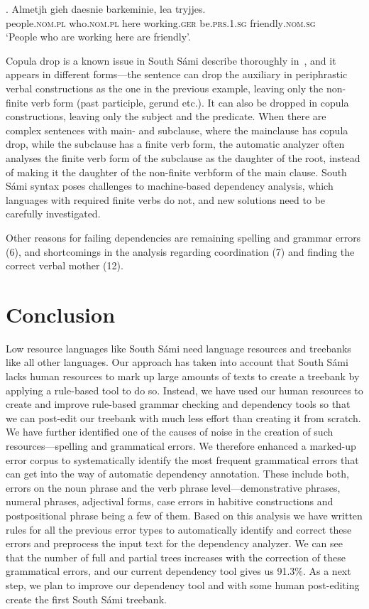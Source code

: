 \documentclass[free]{flammie}
\begin{document}
\exg. Almetjh gieh daesnie barkeminie, lea tryjjes.\label{almetjh}\\
people\textsc{.nom.pl} who\textsc{.nom.pl} here working\textsc{.ger}
be\textsc{.prs.1.sg} friendly\textsc{.nom.sg}\\
`People who are working here are friendly'.

Copula drop is a known issue in South Sámi describe thoroughly
in~\cite{ylikoski2022}, and it appears in different forms---the sentence can
drop the auxiliary in periphrastic verbal constructions as the one in the
previous example, leaving only the non-finite verb form (past participle, gerund
etc.).  It can also be dropped in copula constructions, leaving only the subject
and the predicate. When there are complex sentences with main- and subclause,
where the mainclause has copula drop, while the subclause has a finite verb
form, the automatic analyzer often analyses the finite verb form of the
subclause as the daughter of the root, instead of making it the daughter of the
non-finite verbform of the main clause. South Sámi syntax poses challenges to
machine-based dependency analysis, which languages with required finite verbs do
not, and new solutions need to be carefully investigated.

Other reasons for failing dependencies are remaining spelling and grammar errors
(6), and shortcomings in the analysis regarding coordination (7) and finding the
correct verbal mother (12).
\section{Conclusion}

Low resource languages like South Sámi need language resources and treebanks
like all other languages. Our approach has taken into account that South Sámi
lacks human resources to mark up large amounts of texts to create a treebank by
applying a rule-based tool to do so. Instead, we have used our human resources
to create and improve rule-based grammar checking and dependency tools so that
we can post-edit our treebank with much less effort than creating it from
scratch. We have further identified one of the causes of noise in the creation
of such resources---spelling and grammatical errors. We therefore enhanced a
marked-up error corpus to systematically identify the most frequent grammatical
errors that can get into the way of automatic dependency annotation. These
include both, errors on the noun phrase and the verb phrase
level---demonstrative phrases, numeral phrases, adjectival forms, case errors in
habitive constructions and postpositional phrase being a few of them. Based on
this analysis we have written rules for all the previous error types to
automatically identify and correct these errors and preprocess the input text
for the dependency analyzer.  We can see that the number of full and partial
trees increases with the correction of these grammatical errors, and our current
dependency tool gives us 91.3\%.  As a next step, we plan to improve our
dependency tool and with some human post-editing create the first South Sámi
treebank.
\end{document}

